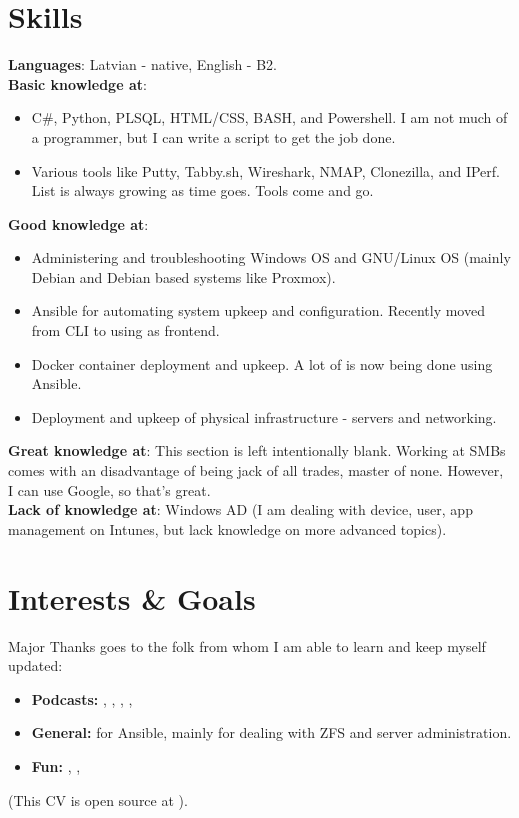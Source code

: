 \documentclass[a4paper]{article}
\newcommand{\myuline}[1]{%
  \uline{\phantom{#1}}%
  \llap{\contour{white}{#1}}%
}
\newcommand{\BlueHref}[3][blue]{\href{#2}{\color{#1}{#3}}}%
\newcommand{\resumeItem}[1]{
  \item\large{
    {#1 \vspace{-2pt}}
  }
}
\newcommand{\resumeItemListStart}{\begin{itemize}}
\newcommand{\resumeItemListEnd}{\end{itemize}\vspace{-5pt}}
\begin{document}
\section{Skills}
 \begin{itemize}[leftmargin=0.15in, label={}]
    \large{\item{
     \textbf{Languages}{: Latvian - native, English - B2.}\\
     \textbf{Basic knowledge at}{:}
     \resumeItemListStart
        \resumeItem{C\#, Python, PLSQL, HTML/CSS, BASH, and Powershell. I am not much of a programmer, but I can write a script to get the job done.}
        \resumeItem{Various tools like Putty, Tabby.sh, Wireshark, NMAP, Clonezilla, and IPerf. List is always growing as time goes. Tools come and go.}
     \resumeItemListEnd
     \textbf{Good knowledge at}{:}
     \resumeItemListStart
        \resumeItem{Administering and troubleshooting Windows OS and GNU/Linux OS (mainly Debian and Debian based systems like Proxmox).}
        \resumeItem{Ansible for automating system upkeep and configuration. Recently moved from CLI to using \BlueHref{https://semaphoreui.com/}{\myuline{SemaphoreUI}} as frontend. }
        \resumeItem{Docker container deployment and upkeep. A lot of is now being done using Ansible.}
        \resumeItem{Deployment and upkeep of physical infrastructure - servers and networking. }
     \resumeItemListEnd
     \textbf{Great knowledge at}{: This section is left intentionally blank. Working at SMBs comes with an disadvantage of being jack of all trades, master of none. \newline However, I can use Google, so that's great. }\\
     \textbf{Lack of knowledge at}{: Windows AD (I am dealing with device, user, app management on Intunes, but lack knowledge on more advanced topics). }
     }}
 \end{itemize}
 
\section{Interests \& Goals}
\large{Major Thanks goes to the folk from whom I am able to learn and keep myself updated:}
\resumeItemListStart
\resumeItem{\textbf{Podcasts:} \BlueHref{https://latenightlinux.com/}{Late Night Linux Family}, \BlueHref{https://blog.apnic.net/ping-podcast/}{PING by APNIC}, \BlueHref{https://labs.ripe.net/category/podcasts/}{The RIPE Labs Podcast by RIPE}, \BlueHref{https://enterpriselinuxsecurity.show/}{Enterprise Linux Security}, \BlueHref{https://packetpushers.net/}{Packet Pushers}}
\resumeItem{\textbf{General:} \BlueHref{https://www.jeffgeerling.com/}{Jeff Geerling} for Ansible, \BlueHref{https://klarasystems.com/}{Klara Systems} mainly for dealing with ZFS and server administration. }
\resumeItem{\textbf{Fun:} \BlueHref{https://tuxdigital.com/}{TuxDigital Network}, \BlueHref{https://www.jupiterbroadcasting.com/}{Jupiter Broadcasting}, \BlueHref{https://twit.tv/}{TWiT}}
\resumeItemListEnd
\begin{flushright}
    \small{(This CV is open source at \BlueHref{https://github.com/NiksSkersts/CV}{Github}).}
\end{flushright}


\end{document}
